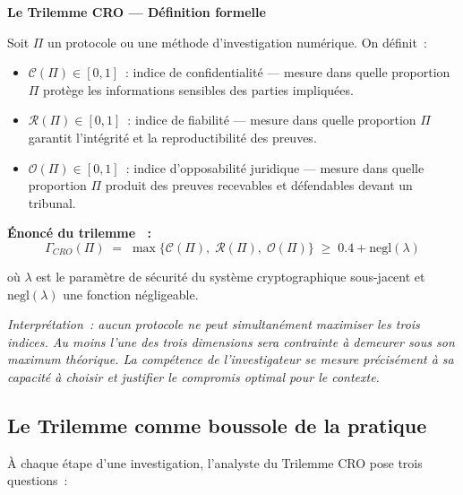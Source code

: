 \begin{boxCRO}
\textbf{Le Trilemme CRO --- Définition formelle}

\medskip
Soit $\Pi$ un protocole ou une méthode d'investigation numérique. On définit~:
\begin{itemize}
    \item $\mathcal{C}(\Pi) \in [0,1]$~: indice de confidentialité ---
          mesure dans quelle proportion $\Pi$ protège les informations
          sensibles des parties impliquées.
    \item $\mathcal{R}(\Pi) \in [0,1]$~: indice de fiabilité ---
          mesure dans quelle proportion $\Pi$ garantit l'intégrité et
          la reproductibilité des preuves.
    \item $\mathcal{O}(\Pi) \in [0,1]$~: indice d'opposabilité juridique ---
          mesure dans quelle proportion $\Pi$ produit des preuves
          recevables et défendables devant un tribunal.
\end{itemize}

\textbf{Énoncé du trilemme \cite{minka2025cro}~:}
\begin{equation}
\Gamma_{CRO}(\Pi) \;=\; \max\bigl\{\mathcal{C}(\Pi),\;
\mathcal{R}(\Pi),\; \mathcal{O}(\Pi)\bigr\}
\;\geq\; 0.4 + \mathrm{negl}(\lambda)
\label{eq:CRO}
\end{equation}

où $\lambda$ est le paramètre de sécurité du système cryptographique sous-jacent
et $\mathrm{negl}(\lambda)$ une fonction négligeable.

\medskip
\textit{Interprétation~: aucun protocole ne peut simultanément maximiser
les trois indices. Au moins l'une des trois dimensions sera contrainte à
demeurer sous son maximum théorique. La compétence de l'investigateur
se mesure précisément à sa capacité à choisir et justifier
le compromis optimal pour le contexte.}
\end{boxCRO}

\subsection{Le Trilemme comme boussole de la pratique}

À chaque étape d'une investigation, l'analyste du Trilemme CRO pose
trois questions~:

